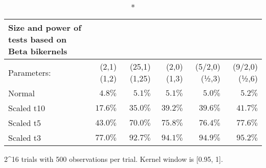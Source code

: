 \setlength{\LTpost}{0mm}
\begin{longtable}{lrrrrr}
\caption*{
{\large Size and power of tests based on Beta bikernels}
} \\ 
\toprule
Parameters: & (2,1)(1,2) & (25,1)(1,25) & (2,0)(1,3) & (5/2,0)(½,3) & (9/2,0)(½,6) \\ 
\midrule
Normal & $4.8\%$ & $5.1\%$ & $5.1\%$ & $5.0\%$ & $5.2\%$ \\ 
Scaled t10 & $17.6\%$ & $35.0\%$ & $39.2\%$ & $39.6\%$ & $41.7\%$ \\ 
Scaled t5 & $43.0\%$ & $70.0\%$ & $75.8\%$ & $76.4\%$ & $77.6\%$ \\ 
Scaled t3 & $77.0\%$ & $92.7\%$ & $94.1\%$ & $94.9\%$ & $95.2\%$ \\ 
\bottomrule
\end{longtable}
\begin{minipage}{\linewidth}
2\textasciicircum{}16 trials with 500 observations per trial.  Kernel window is [0.95, 1].\\
\end{minipage}

